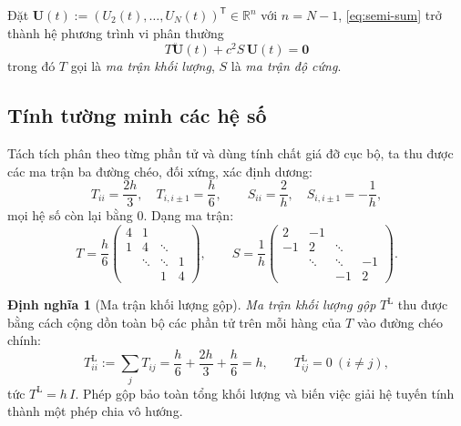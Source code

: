 \documentclass[11pt,a4paper]{article}
\theoremstyle{plain}
\theoremstyle{definition}
\newtheorem{definition}[theorem]{Định nghĩa}
\theoremstyle{remark}
\newcommand{\R}{\mathbb{R}}
\newcommand{\Uvec}{\bm{U}}
\begin{document}
Đặt $\Uvec(t) := (U_{2}(t),\dots,U_{N}(t))^{\mathsf{T}} \in \R^{n}$ với
$n = N-1$, \eqref{eq:semi-sum} trở thành hệ phương trình vi phân thường
\begin{equation}
\label{eq:semidiscrete}
  \boxed{\;T\ddot{\Uvec}(t) + c^{2}S\,\Uvec(t) = \bm{0}\;}
\end{equation}
trong đó $T$ gọi là \emph{ma trận khối lượng}, $S$ là \emph{ma trận độ cứng}.

\subsection{Tính tường minh các hệ số}

Tách tích phân theo từng phần tử và dùng tính chất giá đỡ cục bộ, ta thu
được các ma trận ba đường chéo, đối xứng, xác định dương:
\begin{equation}
\label{eq:TSvalues}
  T_{ii} = \frac{2h}{3},\quad T_{i,i\pm 1} = \frac{h}{6},
  \qquad
  S_{ii} = \frac{2}{h},\quad S_{i,i\pm 1} = -\frac{1}{h},
\end{equation}
mọi hệ số còn lại bằng $0$. Dạng ma trận:
\begin{equation}
\label{eq:TSmatrix}
  T = \frac{h}{6}
  \begin{pmatrix}
    4 & 1 &        &   \\
    1 & 4 & \ddots &   \\
      & \ddots & \ddots & 1 \\
      &   & 1 & 4
  \end{pmatrix},
  \qquad
  S = \frac{1}{h}
  \begin{pmatrix}
    2 & -1 &        &   \\
   -1 &  2 & \ddots &   \\
      & \ddots & \ddots & -1 \\
      &   & -1 & 2
  \end{pmatrix}.
\end{equation}

\begin{definition}[Ma trận khối lượng gộp]
\label{def:lumped}
\emph{Ma trận khối lượng gộp} $T^{\mathrm{L}}$ thu được bằng cách cộng dồn
toàn bộ các phần tử trên mỗi hàng của $T$ vào đường chéo chính:
\begin{equation}
\label{eq:lumped}
  T^{\mathrm{L}}_{ii} := \sum_{j} T_{ij}
  = \frac{h}{6} + \frac{2h}{3} + \frac{h}{6} = h,
  \qquad T^{\mathrm{L}}_{ij} = 0 \ (i \neq j),
\end{equation}
tức $T^{\mathrm{L}} = h\,I$. Phép gộp bảo toàn tổng khối lượng và biến việc
giải hệ tuyến tính thành một phép chia vô hướng.
\end{definition}
\end{document}
